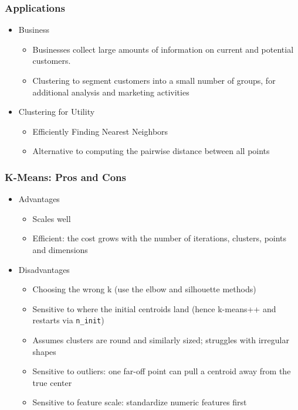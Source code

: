 \begin{frame}[fragile]\frametitle{Applications}
\begin{itemize}
\item Business
	\begin{itemize}
	\item Businesses collect large amounts of information on current and potential customers.
	\item Clustering to segment customers into a small number of groups, for additional analysis and marketing activities
	\end{itemize}
\item Clustering for Utility
	\begin{itemize}
	\item Efficiently Finding Nearest Neighbors
	\item Alternative to computing the pairwise distance between all points
	\end{itemize}
\end{itemize}
\end{frame}

\begin{frame}[fragile]\frametitle{K-Means: Pros and Cons}
\begin{itemize}
\item  Advantages
\begin{itemize}
\item  Scales well
\item   Efficient: the cost grows with the number of iterations, clusters, points and dimensions
\end{itemize}
\item  Disadvantages
\begin{itemize}
\item Choosing the wrong k (use the elbow and silhouette methods)
\item Sensitive to where the initial centroids land (hence k-means++ and restarts via \texttt{n\_init})
\item Assumes clusters are round and similarly sized; struggles with irregular shapes
\item Sensitive to outliers: one far-off point can pull a centroid away from the true center
\item Sensitive to feature scale: standardize numeric features first
\end{itemize}
\end{itemize}
\end{frame}

